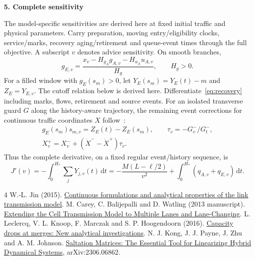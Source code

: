 \documentclass[10pt,a4paper]{article}
\newcommand{\dd}{\,\mathrm d}
\newcommand{\head}[1]{\par\vspace{4pt}\noindent\textbf{#1}\par\nobreak\vspace{1pt}}
\begin{document}
\newpage
\head{5. Complete sensitivity}
The model-specific sensitivities are derived here at fixed initial traffic
and physical parameters. Carry preparation, moving entry/eligibility clocks,
service/marks, recovery aging/retirement and queue-event times through the
full objective. A subscript $v$ denotes advice sensitivity. On smooth branches,
\begin{equation}
 g_{E,v}=\frac{x_v-H_{g_A}g_{A,v}-H_{u_A}u_{A,v}}{H_g},\qquad H_g>0.
 \label{eq:rootgradient}
\end{equation}
For a filled window with $g_E(s_m)>0$, let $Y_E(s_m)=Y_E(t)-m$ and $Z_E=Y_{E,v}$.
The cutoff relation below is derived here. Differentiate~\eqref{eq:recovery}
including marks, flows, retirement and source events. For an isolated
transverse guard $G$ along the history-aware trajectory, the remaining
event corrections for continuous traffic coordinates $X$ follow~\cite{kong}:
\begin{equation}
 \begin{gathered}
 g_E(s_m)s_{m,v}=Z_E(t)-Z_E(s_m),\qquad \tau_v=-G_v^-/G_t^-,\\
 X_v^+=X_v^-+(\dot X^- -\dot X^+)\tau_v.
 \end{gathered}
 \label{eq:eventgradient}
\end{equation}
Thus the complete derivative, on a fixed regular event/history sequence, is
\begin{equation}
 J'(v)=-\int_0^{H_*}\!\sum_jY_{j,v}(t)\dd t
 =-\frac{M(L-\ell/2)}{v^2}+\int_0^{H_*}(q_{A,v}+q_{E,v})\dd t.
 \label{eq:objectivegradient}
\end{equation}
\makeatletter
\renewcommand{\section}{\@ifstar{\head}{\head}}
\makeatother
\begin{thebibliography}{4}
\setlength{\itemsep}{0pt}\setlength{\parskip}{0pt}
 W.-L. Jin (2015).
\href{https://arxiv.org/pdf/1405.7080}{Continuous formulations and analytical
properties of the link transmission model}.
 M. Carey, C. Balijepalli and D. Watling (2013 manuscript).
\href{https://doi.org/10.1007/s11067-013-9193-7}{Extending the Cell Transmission
Model to Multiple Lanes and Lane-Changing}.
 L. Leclercq, V. L. Knoop, F. Marczak and S. P. Hoogendoorn (2016).
\href{https://doi.org/10.1016/j.trc.2015.06.025}{Capacity drops at merges:
New analytical investigations}.
 N. J. Kong, J. J. Payne, J. Zhu and A. M. Johnson.
\href{https://arxiv.org/abs/2306.06862}{Saltation Matrices: The Essential Tool
for Linearizing Hybrid Dynamical Systems}, arXiv:2306.06862.
\end{thebibliography}
\end{document}
